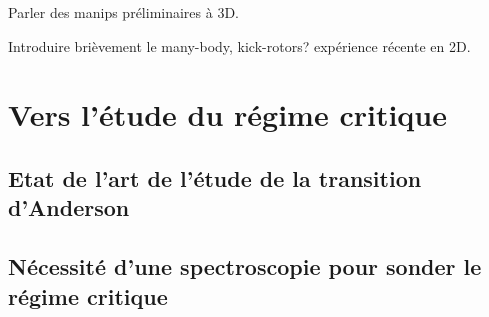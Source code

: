 Parler des manips préliminaires à 3D. 

Introduire brièvement le many-body, kick-rotors?
expérience récente en 2D.









\section{Vers l'étude du régime critique}
\subsection{Etat de l'art de l'étude de la transition d'Anderson}
\lipsum[6]
\subsection{Nécessité d'une spectroscopie pour sonder le régime critique}
\lipsum[7]







